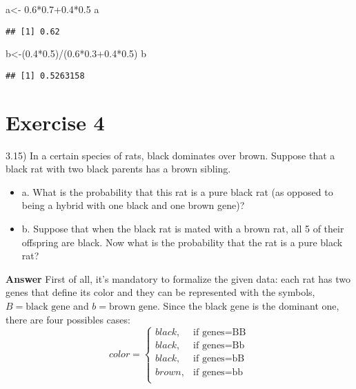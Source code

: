 \documentclass[
]{article}
\newenvironment{Shaded}{\begin{snugshade}}{\end{snugshade}}
\newcommand{\FloatTok}[1]{\textcolor[rgb]{0.00,0.00,0.81}{#1}}
\newcommand{\NormalTok}[1]{#1}
\newcommand{\OtherTok}[1]{\textcolor[rgb]{0.56,0.35,0.01}{#1}}
\newcommand{\SpecialCharTok}[1]{\textcolor[rgb]{0.00,0.00,0.00}{#1}}
\providecommand{\tightlist}{%
  \setlength{\itemsep}{0pt}\setlength{\parskip}{0pt}}
\begin{document}
\begin{Shaded}
\begin{Highlighting}[]
\NormalTok{a}\OtherTok{\textless{}{-}} \FloatTok{0.6}\SpecialCharTok{*}\FloatTok{0.7+0.4}\SpecialCharTok{*}\FloatTok{0.5}
\NormalTok{a}
\end{Highlighting}
\end{Shaded}

\begin{verbatim}
## [1] 0.62
\end{verbatim}

\begin{Shaded}
\begin{Highlighting}[]
\NormalTok{b}\OtherTok{\textless{}{-}}\NormalTok{(}\FloatTok{0.4}\SpecialCharTok{*}\FloatTok{0.5}\NormalTok{)}\SpecialCharTok{/}\NormalTok{(}\FloatTok{0.6}\SpecialCharTok{*}\FloatTok{0.3+0.4}\SpecialCharTok{*}\FloatTok{0.5}\NormalTok{)}
\NormalTok{b}
\end{Highlighting}
\end{Shaded}

\begin{verbatim}
## [1] 0.5263158
\end{verbatim}

\hypertarget{exercise-4}{%
\section{Exercise 4}\label{exercise-4}}

3.15) In a certain species of rats, black dominates over brown. Suppose
that a black rat with two black parents has a brown sibling.

\begin{itemize}
\tightlist
\item
  a. What is the probability that this rat is a pure black rat (as
  opposed to being a hybrid with one black and one brown gene)?
\item
  b. Suppose that when the black rat is mated with a brown rat, all 5 of
  their offspring are black. Now what is the probability that the rat is
  a pure black rat?
\end{itemize}

\textbf{Answer} First of all, it's mandatory to formalize the given
data: each rat has two genes that define its color and they can be
represented with the symbols, \(B=\text{black gene}\) and
\(b=\text{brown gene}\). Since the black gene is the dominant one, there
are four possibles cases: \[
color = \begin{cases} 
black, & \mbox{if genes=BB}\\
black, & \mbox{if genes=Bb}\\
black, & \mbox{if genes=bB}\\
brown, & \mbox{if genes=bb}\\
\end{cases}\]
\end{document}
